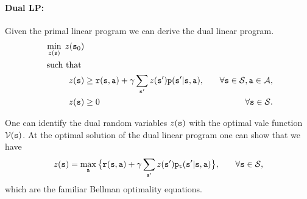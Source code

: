 \paragraph{Dual LP:}
Given the primal linear program we can derive the dual linear
program.
\begin{align*}
\min_{z(\state)}  \;z(\state_0)&\\
\mbox{ such that }\\
%
 z(\state) &\geq
\reward(\state,\action) + \discount
\sum_{\state'}z(\state')\transitionprob(\state'|\state,\action) , &\quad\forall
\state \in {\States},\action\in\Actions, \\ 
 z(\state) &\geq 0  &\quad\forall \state \in {\States}.
\end{align*}

One can identify the dual random variables $z({\tt s})$ with the
optimal vale function $\mathcal{V}({\tt s})$. At the optimal solution of
the dual linear program one can show that we have
\begin{align*}
 z({\tt s}) &= \max_{\tt a} \big\{
{\tt r}({\tt s},{\tt a}) + \gamma
\sum_{{\tt s}'}z({\tt s}'){\tt p}_{{\tt t}}({\tt s}'|{\tt s},{\tt a}) \big\} ,
&\quad\forall {\tt s} \in {\mathcal{S}},
\end{align*}
which are the familiar Bellman optimality equations.

%
%
%
%

